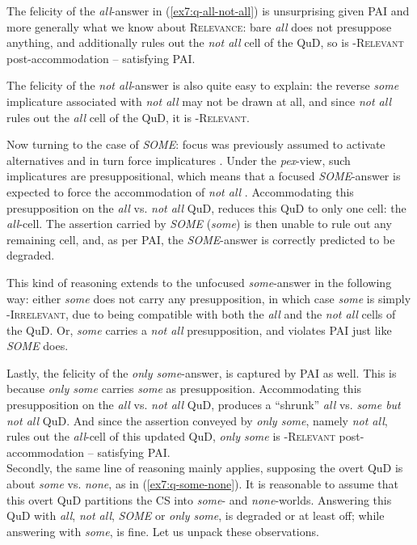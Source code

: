 The felicity of the \textit{all}-answer in (\ref{ex7:q-all-not-all}) is unsurprising given PAI and more generally what we know about \textsc{Relevance}: bare \textit{all} does not presuppose anything, and additionally rules out the \textit{not all} cell of the QuD, so is \textsc{\citeauthor{Roberts2012}-Relevant} post-accommodation -- satisfying PAI.

The felicity of the \textit{not all}-answer is also quite easy to explain: the reverse \textit{some} implicature associated with \textit{not all} may not be drawn at all, and since \textit{not all} rules out the \textit{all} cell of the QuD, it is \textsc{\citeauthor{Roberts2012}-Relevant}.

Now turning to the case of \textit{SOME}: focus was previously assumed to activate alternatives and in turn force implicatures \citep{Rooth1992,Chierchia2011}. Under the \textit{pex}-view, such implicatures are presuppositional, which means that a focused \textit{SOME}-answer is expected to force the accommodation of \textit{not all} \citep{Bassi2021}. Accommodating this presupposition on the \textit{all} vs. \textit{not all} QuD, reduces this QuD to only one cell: the \textit{all}-cell. The assertion carried by \textit{SOME} (\textit{some}) is then unable to rule out any remaining cell, and, as per PAI, the \textit{SOME}-answer is correctly predicted to be degraded. 

This kind of reasoning extends to the unfocused \textit{some}-answer in the following way: either \textit{some} does not carry any presupposition, in which case \textit{some} is simply \textsc{\citeauthor{Roberts2012}-Irrelevant}, due to being compatible with both the \textit{all} and the \textit{not all} cells of the QuD. Or, \textit{some} carries a \textit{not all} presupposition, and violates PAI just like \textit{SOME} does. 

Lastly, the felicity of the \textit{only some}-answer, is captured by PAI as well. This is because \textit{only some} carries \textit{some} as presupposition. Accommodating this presupposition on the \textit{all} vs. \textit{not all} QuD, produces a ``shrunk'' \textit{all} vs. \textit{some but not all} QuD. And since the assertion conveyed by \textit{only some}, namely \textit{not all}, rules out the \textit{all}-cell of this updated QuD, \textit{only some} is \textsc{\citeauthor{Roberts2012}-Relevant} post-accommodation -- satisfying PAI.\\


Secondly, the same line of reasoning mainly applies, supposing the overt QuD is about \textit{some} vs. \textit{none}, as in (\ref{ex7:q-some-none}). It is reasonable to assume that this overt QuD partitions the CS into \textit{some}- and \textit{none}-worlds. Answering this QuD with \textit{all}, \textit{not all}, \textit{SOME} or \textit{only some}, is degraded or at least off; while answering with \textit{some}, is fine. Let us unpack these observations.

